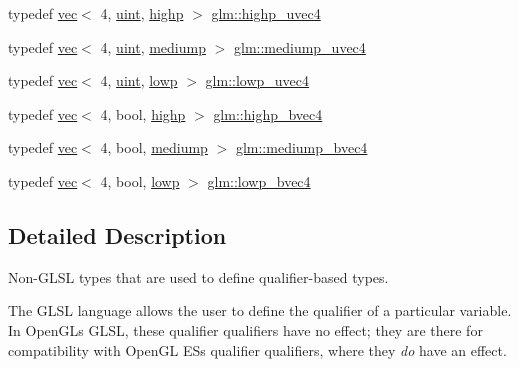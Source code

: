 \begin{DoxyCompactItemize}
\item 
typedef \hyperlink{structglm_1_1vec}{vec}$<$ 4, \hyperlink{group__core__precision_ga4fd29415871152bfb5abd588334147c8}{uint}, \hyperlink{namespaceglm_a36ed105b07c7746804d7fdc7cc90ff25ac6f7eab42eacbb10d59a58e95e362074}{highp} $>$ \hyperlink{group__core__precision_gae48d6e9a99afc33e6fa51e5d576dfd1a}{glm\+::highp\+\_\+uvec4}
\item 
typedef \hyperlink{structglm_1_1vec}{vec}$<$ 4, \hyperlink{group__core__precision_ga4fd29415871152bfb5abd588334147c8}{uint}, \hyperlink{namespaceglm_a36ed105b07c7746804d7fdc7cc90ff25a6416f3ea0c9025fb21ed50c4d6620482}{mediump} $>$ \hyperlink{group__core__precision_ga204494f26e258e26882acf5288415ebd}{glm\+::mediump\+\_\+uvec4}
\item 
typedef \hyperlink{structglm_1_1vec}{vec}$<$ 4, \hyperlink{group__core__precision_ga4fd29415871152bfb5abd588334147c8}{uint}, \hyperlink{namespaceglm_a36ed105b07c7746804d7fdc7cc90ff25ae161af3fc695e696ce3bf69f7332bc2d}{lowp} $>$ \hyperlink{group__core__precision_ga0ecd5668a8e001e14a9dab2cffd09285}{glm\+::lowp\+\_\+uvec4}
\item 
typedef \hyperlink{structglm_1_1vec}{vec}$<$ 4, bool, \hyperlink{namespaceglm_a36ed105b07c7746804d7fdc7cc90ff25ac6f7eab42eacbb10d59a58e95e362074}{highp} $>$ \hyperlink{group__core__precision_gaa99e0301060bf06e7750c1c3591b6b4e}{glm\+::highp\+\_\+bvec4}
\item 
typedef \hyperlink{structglm_1_1vec}{vec}$<$ 4, bool, \hyperlink{namespaceglm_a36ed105b07c7746804d7fdc7cc90ff25a6416f3ea0c9025fb21ed50c4d6620482}{mediump} $>$ \hyperlink{group__core__precision_ga064ca037c066a4d47ab6d34c2cf0ae2f}{glm\+::mediump\+\_\+bvec4}
\item 
typedef \hyperlink{structglm_1_1vec}{vec}$<$ 4, bool, \hyperlink{namespaceglm_a36ed105b07c7746804d7fdc7cc90ff25ae161af3fc695e696ce3bf69f7332bc2d}{lowp} $>$ \hyperlink{group__core__precision_ga9c156bdb6dd02d35826ee77094ff3cdf}{glm\+::lowp\+\_\+bvec4}
\end{DoxyCompactItemize}


\subsection{Detailed Description}
Non-\/\+G\+L\+SL types that are used to define qualifier-\/based types. 

The G\+L\+SL language allows the user to define the qualifier of a particular variable. In Open\+GL\textquotesingle{}s G\+L\+SL, these qualifier qualifiers have no effect; they are there for compatibility with Open\+GL ES\textquotesingle{}s qualifier qualifiers, where they {\itshape do} have an effect.

